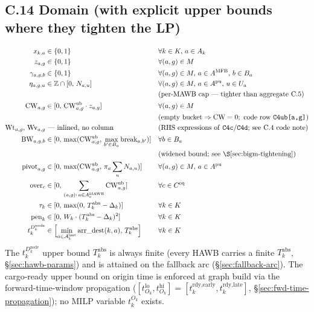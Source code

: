 \documentclass[11pt,a4paper]{article}
\theoremstyle{definition}
\begin{document}
\subsection*{C.14 Domain (with explicit upper bounds where they tighten the LP)}
\label{sec:domain}

\begin{align*}
  x_{k,a}      &\in \{0, 1\}                              & & \forall k \in K,\, a \in A_k \\
  z_{a,g}      &\in \{0, 1\}                              & & \forall (a, g) \in M \\
  \gamma_{a,g,b} &\in \{0, 1\}                            & & \forall (a, g) \in M,\, a \in A^{\text{MFB}},\, b \in B_a \\
  \eta_{a,g,u} &\in \mathbb{Z} \cap [0,\, N_{a,u}]        & & \forall (a, g) \in M,\, a \in A^{\text{pu}},\, u \in U_a \\
               & & & \text{(per-MAWB cap --- tighter than aggregate C.5)} \\
  \text{CW}_{a,g} &\in [0,\, \text{CW}^{\text{ub}}_{a,g} \cdot z_{a,g}] & & \forall (a, g) \in M \\
               & & & \text{(empty bucket} \Rightarrow \text{CW} = 0;\ \text{code row } \texttt{C4ub[a,g]}) \\
  \text{Wt}_{a,g},\,\text{Wv}_{a,g} & \text{ --- inlined, no column} & & \text{(RHS expressions of \texttt{C4c}/\texttt{C4d}; see C.4 code note)} \\
  \text{BW}_{a,g,b} &\in [0,\, \max(\text{CW}^{\text{ub}}_{a,g},\, \max_{b' \in B_a} \text{break}_{a,b'})] & & \forall b \in B_a \\
                & & & \text{(widened bound; see \S\ref{sec:bigm-tightening})} \\
  \text{pivot}_{a,g} &\in [0,\, \max(\text{CW}^{\text{ub}}_{a,g},\, \pi_a \sum_u N_{a,u})] & & \forall (a, g) \in M,\, a \in A^{\text{pu}} \\
  \text{over}_c &\in [0,\, \sum_{(a,g) :\, a \in A_c^{\text{MAWB}}} \text{CW}^{\text{ub}}_{a,g}] & & \forall c \in C^{\text{eq}} \\
  \tau_k        &\in [0,\, \max(0,\, T_k^{\text{abs}} - \Delta_k)] & & \forall k \in K \\
  \text{pen}_k  &\in [0,\, W_k \cdot (T_k^{\text{abs}} - \Delta_k)^2] & & \forall k \in K \\
  t_k^{D_k^{\text{node}}} &\in \Bigl[\min_{a \in \mathcal{A}^{\text{last}}_k} \text{arr\_dest}(k, a),\, T_k^{\text{abs}}\Bigr] & & \forall k \in K
\end{align*}
The $t_k^{D_k^{\text{node}}}$ upper bound $T_k^{\text{abs}}$ is always finite
(every HAWB carries a finite $T_k^{\text{abs}}$, \S\ref{sec:hawb-params})
and is attained on the fallback arc (\S\ref{sec:fallback-arc}). The
cargo-ready upper bound on origin time is enforced at graph build via the
forward-time-window propagation
($[t^{\text{lo}}_{O_k}, t^{\text{hi}}_{O_k}] = [t_k^{\text{rdy,early}},
t_k^{\text{rdy,late}}]$, \S\ref{sec:fwd-time-propagation}); no MILP variable
$t_k^{O_k}$ exists.
\end{document}
